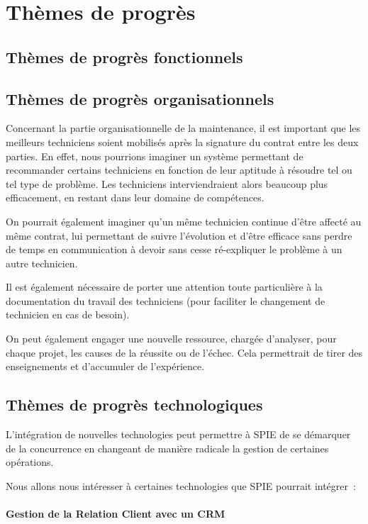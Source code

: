 \chapter{Thèmes de progrès}

\section{Thèmes de progrès fonctionnels}

\section{Thèmes de progrès organisationnels}

Concernant la partie organisationnelle de la maintenance, il est important que les meilleurs techniciens soient mobilisés après la signature du contrat entre les deux parties. En effet, nous pourrions imaginer un système permettant de recommander certains techniciens en fonction de leur aptitude à résoudre tel ou tel type de problème. Les techniciens interviendraient alors beaucoup plus efficacement, en restant dans leur domaine de compétences.

On pourrait également imaginer qu'un même technicien continue d'être affecté au même contrat, lui permettant de suivre l'évolution et d'être efficace sans perdre de temps en communication à devoir sans cesse ré-expliquer le problème à un autre technicien.

Il est également nécessaire de porter une attention toute particulière à la documentation du travail des techniciens (pour faciliter le changement de technicien en cas de besoin).

On peut également engager une nouvelle ressource, chargée d'analyser, pour chaque projet, les causes de la réussite ou de l'échec. Cela permettrait de tirer des enseignements et d'accumuler de l'expérience.

\section{Thèmes de progrès technologiques}

    L'intégration de nouvelles technologies peut permettre à SPIE de se démarquer de la concurrence en changeant de manière radicale la gestion de certaines opérations.

    Nous allons nous intéresser à certaines technologies que SPIE pourrait intégrer~:

        \subsubsection{Gestion de la Relation Client avec un CRM}

